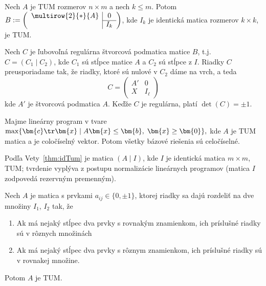 \begin{veta}
  \label{thm:idTum}
  Nech $A$ je TUM rozmerov $n\times m$ a nech $k\le m$. Potom
$B:=\left(\begin{array}{c|c}\multirow{2}{*}{{\Large A}}&0\\\cline{2-2} &I_k\end{array}\right)$, kde
  $I_k$ je identická matica rozmerov $k\times k$, je TUM.
\end{veta}
\begin{dokaz}
  Nech $C$ je ľubovoľná regulárna štvorcová podmatica matice $B$, t.j. $C=(C_1\mid C_2)$, kde
  $C_1$ sú stĺpce matice $A$ a $C_2$ sú stĺpce z $I$. Riadky $C$ preusporiadame tak, že
  riadky, ktoré sú nulové v $C_2$ dáme na vrch, a teda 
$$C=\left(\begin{array}{c|c}A'&0\\\hline X&I_\ell\end{array}\right)$$
  kde $A'$ je štvorcová podmatica $A$. Keďže $C$ je regulárna, platí $\det(C)=\pm1$.
\end{dokaz}

\begin{veta}
  Majme lineárny program v tvare
  $\max\{\bm{c}\tr\bm{x}\mid A\bm{x}\le\bm{b},\;\bm{x}\ge\bm{0}\},$
  kde $A$ je TUM matica a  je coločíselný vektor.
  Potom všetky bázové riešenia sú celočíselné.
\end{veta}
\begin{dokaz}
  Podľa Vety~\ref{thm:idTum} je 
   matica $(A\mid I)$, kde $I$ je identická matica $m\times m$, TUM; tvrdenie  vyplýva z 
  postupu normalizácie lineárnych programov (matica $I$ zodpovedá rezervným premenným).
\end{dokaz}

\begin{veta}
  \label{thm:unimod}
  Nech $A$ je matica s prvkami $a_{ij}\in\{0,\pm1\}$, ktorej riadky sa dajú rozdeliť na dve množiny $I_1$, $I_2$ tak, že
  \begin{enumerate}
    \item Ak má nejaký stĺpec dva prvky s rovnakým znamienkom, ich príslušné riadky sú v rôznych množinách
    \item Ak má nejaký stĺpec dva prvky s rôznym znamienkom, ich príslušné riadky sú v rovnakej množine.
  \end{enumerate}
  Potom $A$ je TUM.
\end{veta}


